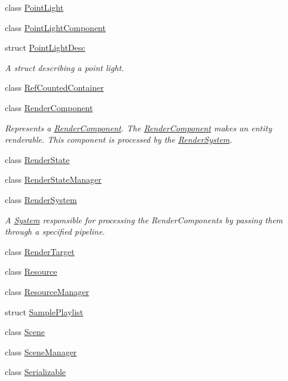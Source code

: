 \begin{DoxyCompactItemize}
class \hyperlink{class_blade_1_1_point_light}{Point\+Light}
\item 
class \hyperlink{class_blade_1_1_point_light_component}{Point\+Light\+Component}
\item 
struct \hyperlink{struct_blade_1_1_point_light_desc}{Point\+Light\+Desc}
\begin{DoxyCompactList}\small\item\em A struct describing a point light. \end{DoxyCompactList}\item 
class \hyperlink{class_blade_1_1_ref_counted_container}{Ref\+Counted\+Container}
\item 
class \hyperlink{class_blade_1_1_render_component}{Render\+Component}
\begin{DoxyCompactList}\small\item\em Represents a \hyperlink{class_blade_1_1_render_component}{Render\+Component}. The \hyperlink{class_blade_1_1_render_component}{Render\+Component} makes an entity renderable. This component is processed by the \hyperlink{class_blade_1_1_render_system}{Render\+System}. \end{DoxyCompactList}\item 
class \hyperlink{class_blade_1_1_render_state}{Render\+State}
\item 
class \hyperlink{class_blade_1_1_render_state_manager}{Render\+State\+Manager}
\item 
class \hyperlink{class_blade_1_1_render_system}{Render\+System}
\begin{DoxyCompactList}\small\item\em A \hyperlink{class_blade_1_1_system}{System} responsible for processing the Render\+Components by passing them through a specified pipeline. \end{DoxyCompactList}\item 
class \hyperlink{class_blade_1_1_render_target}{Render\+Target}
\item 
class \hyperlink{class_blade_1_1_resource}{Resource}
\item 
class \hyperlink{class_blade_1_1_resource_manager}{Resource\+Manager}
\item 
struct \hyperlink{struct_blade_1_1_sample_playlist}{Sample\+Playlist}
\item 
class \hyperlink{class_blade_1_1_scene}{Scene}
\item 
class \hyperlink{class_blade_1_1_scene_manager}{Scene\+Manager}
\item 
class \hyperlink{class_blade_1_1_serializable}{Serializable}

\end{DoxyCompactItemize}
